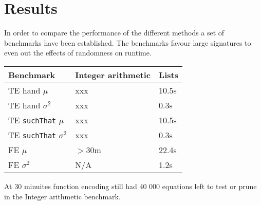 \section{Results}\label{results}

In order to compare the performance of the different methods
a set of benchmarks have been established. The benchmarks favour
large signatures to even out the effects of randomness on runtime.

\begin{tabular}{|l|l|l|}
    \hline
    Benchmark                       & Integer arithmetic & Lists \\ \hline
    TE hand $\mu$                   & xxx                & 10.5s \\ \hline
    TE hand $\sigma^2$              & xxx                & 0.3s  \\ \hline
    TE \texttt{suchThat} $\mu$      & xxx                & 10.5s \\ \hline
    TE \texttt{suchThat} $\sigma^2$ & xxx                & 0.3s  \\ \hline
    FE $\mu$                        & $>$30m             & 22.4s \\ \hline
    FE $\sigma^2$                   & N/A                & 1.2s  \\ \hline
\end{tabular}

At 30 minuites function encoding still had
40 000 equations left to test or prune in the Integer arithmetic benchmark.
